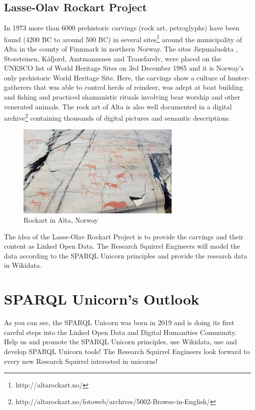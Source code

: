\documentclass[twocolumn]{autart}
\begin{document}
\subsection{Lasse-Olav Rockart Project}

In 1973 more than 6000 prehistoric carvings (rock art, petroglyphs) have been found (4200 BC to around 500 BC) in several sites\footnote{http://altarockart.no/}  around the municipality of Alta in the county of Finnmark in northern Norway. The sites Jiepmaluokta , Storsteinen, Kåfjord, Amtmannsnes and Transfarelv, were placed on the UNESCO list of World Heritage Sites on 3rd December 1985 and it is Norway's only prehistoric World Heritage Site. Here, the carvings show a culture of hunter-gatherers that was able to control herds of reindeer, was adept at boat building and fishing and practiced shamanistic rituals involving bear worship and other venerated animals. The rock art of Alta is also well documented in a digital archive\footnote{http://altarockart.no/fotoweb/archives/5002-Browse-in-English/} containing thousands of digital pictures and semantic descriptions.

\begin{figure}[!htb]
\begin{center}
\includegraphics[width=8cm]{20190616_134048.jpg}
\caption{Rockart in Alta, Norway}
\label{rq1}
\end{center}
\end{figure}

The idea of the Lasse-Olav Rockart Project is to provide the carvings and their content as Linked Open Data. The Research Squirrel Engineers will model the data according to the SPARQL Unicorn principles and provide the research data in Wikidata.

\section{SPARQL Unicorn’s Outlook}

As you can see, the SPARQL Unicorn was born in 2019 and is doing its first careful steps into the Linked Open Data and Digital Humanities Community. Help us and promote the SPARQL Unicorn principles, use Wikidata, use and develop SPARQL Unicorn tools! The Research Squirrel Engineers look forward to every new Research Squirrel interested in unicorns!



\end{document}
